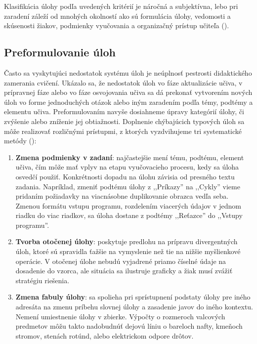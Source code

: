 Klasifikácia úlohy podľa uvedených kritérií je náročná a subjektívna, lebo pri zaradení záleží od mnohých okolností ako sú formulácia úlohy, vedomosti a skúsenosti žiakov, podmienky vyučovania a organizačný prístup učiteľa (\cite{mindakova_tvorba_2008}).

\subsection{Preformulovanie úloh}
Často sa vyskytujúci nedostatok systému úloh je neúplnosť pestrosti didaktického zamerania cvičení. Ukázalo sa, že nedostatok úloh vo fáze aktualizácie učiva, v prípravnej fáze alebo vo fáze osvojovania učiva sa dá prekonať vytvorením nových úloh vo forme jednoduchých otázok alebo iným zaradením podľa témy, podtémy a elementu učiva. Preformulovaním navyše dosiahneme úpravy kategórií úlohy, či zvýšenie alebo zníženie jej obtiažnosti. Doplnenie chýbajúcich typových úloh sa môže realizovať rozličnými prístupmi, z ktorých vyzdvihujeme tri systematické metódy (\cite{mindakova_tvorba_2008}):

\begin{enumerate}[label=\alph*),noitemsep,topsep=0pt]
\item \textbf{Zmena podmienky v zadaní}: najčastejšie mení tému, podtému, element učiva, čím môže mať vplyv na etapu vyučovacieho procesu, kedy sa úloha osvedčí použiť. Konkrétnosti dopadu na úlohu závisia od presného textu zadania. Napríklad, zmeniť podtému úlohy z ,,Príkazy'' na ,,Cykly'' vieme pridaním požiadavky na viacnásobne duplikovanie obrazca vedľa seba. Zmenou formátu vstupu programu, rozdelením viacerých údajov v jednom riadku do viac riadkov, sa úloha dostane z podtémy ,,Reťazce'' do ,,Vstupy programu''.
\item \textbf{Tvorba otočenej úlohy}: poskytuje predlohu na prípravu divergentných úloh, ktoré sú spravidla ťažšie na vymyslenie než tie na nižšie myšlienkové operácie. V otočenej úlohe nebudú vyjadrené priamo číselné údaje na dosadenie do vzorca, ale situácia sa ilustruje graficky a žiak musí zvážiť stratégiu riešenia.
\item \textbf{Zmena fabuly úlohy}: sa spolieha pri sprístupnení podstaty úlohy pre iného adresáta na zmenu príbehu slovnej úlohy a zasadenie javov do iného kontextu. Nemení umiestnenie úlohy v zbierke. Výpočty o rozmeroch valcových predmetov môžu takto nadobudnúť dejovú líniu o bareloch nafty, kmeňoch stromov, stenách rotúnd, alebo elektrickom odpore drôtov.
\end{enumerate}

